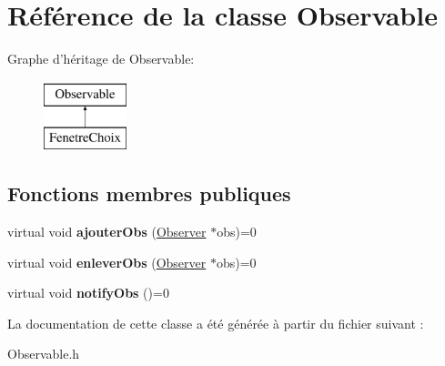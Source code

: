 \hypertarget{classObservable}{\section{\-Référence de la classe \-Observable}
\label{classObservable}
}
\-Graphe d'héritage de \-Observable\-:\begin{figure}[H]
\begin{center}
\leavevmode
\includegraphics[height=2.000000cm]{classObservable}
\end{center}
\end{figure}
\subsection*{\-Fonctions membres publiques}
\begin{DoxyCompactItemize}
\item 
\hypertarget{classObservable_a02a760ccb777fc6b62b94bb9f6ed75ae}{virtual void {\bfseries ajouter\-Obs} (\hyperlink{classObserver}{\-Observer} $\ast$obs)=0}\label{classObservable_a02a760ccb777fc6b62b94bb9f6ed75ae}

\item 
\hypertarget{classObservable_af60bd92dedfc8befac0cc4fab2845846}{virtual void {\bfseries enlever\-Obs} (\hyperlink{classObserver}{\-Observer} $\ast$obs)=0}\label{classObservable_af60bd92dedfc8befac0cc4fab2845846}

\item 
\hypertarget{classObservable_a0ebba92c40eb637c53346e088cd79880}{virtual void {\bfseries notify\-Obs} ()=0}\label{classObservable_a0ebba92c40eb637c53346e088cd79880}

\end{DoxyCompactItemize}


\-La documentation de cette classe a été générée à partir du fichier suivant \-:\begin{DoxyCompactItemize}
\item 
\-Observable.\-h\end{DoxyCompactItemize}
